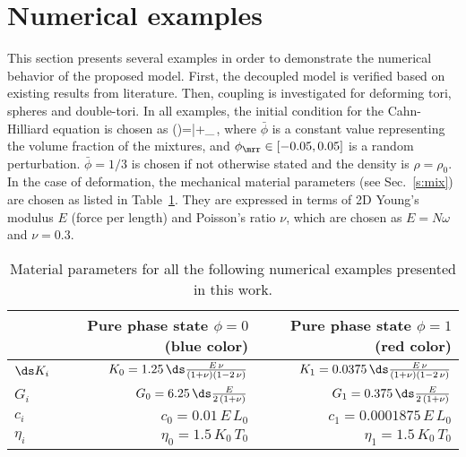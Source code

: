 \documentclass[11pt]{article}
\begin{document}
\section{Numerical examples}\label{s:num_ex}

This section presents several examples in order to demonstrate the numerical behavior of the proposed model.
First, the decoupled model is verified based on existing results from literature. 
Then, coupling is investigated for deforming tori, spheres and double-tori. 
%
In all examples, the initial condition for the Cahn-Hilliard equation is chosen as
\phi(\bx)=\bar{\phi}+\phi_\mrr\,, 
\label{eq:ic}
\eqe
where $\bar{\phi}$ is a constant value representing the volume fraction of the mixtures, and $\phi_\mrr \in [-0.05,0.05]$ is a random perturbation. 
$\bar{\phi}=1/3$ is chosen if not otherwise stated and the density is $\rho = \rho_0$. 
In the case of deformation, the mechanical material parameters (see Sec.~\ref{s:mix}) are chosen as listed in Table~\ref{tab:mat}.
They are expressed in terms of 2D Young's modulus $E$ (force per length) and Poisson's ratio $\nu$, which are chosen as
$E = N\omega$ and $\nu = 0.3$. 

\begin{table}[h]
\begin{center}
\begin{tabular}{| p{1.8cm} | r | r |}
    \hline
    $\,$ & Pure phase state $\phi=0$ (blue color)  & Pure phase state $\phi= 1$ (red color)\\ \hline
    $\ds K_i$ & $K_0 = 1.25\,\ds \frac{E\,\nu}{(1+\nu)(1-2\,\nu)}$ & $K_1 = 0.0375\,\ds \frac{E\,\nu}{(1+\nu)(1-2\,\nu)}$ \\ \hline
    $G_i$ & $G_0 = 6.25\,\ds \frac{E}{2\,(1+\nu)}$ & $G_1 = 0.375\,\ds \frac{E}{2\,(1+\nu)}$ \\ \hline
    $c_i$ & $c_0=0.01\,E\,L_0$ & $c_1 = 0.0001875\,E\,L_0$ \\ \hline
    $\eta_i$ & $\eta_0 = 1.5\,K_0\,T_0$ & $\eta_1 = 1.5\,K_0\,T_0$ \\
    \hline
\end{tabular}
\end{center}
\caption{Material parameters for all the following numerical examples presented in this work.}
\label{tab:mat}
\end{table}
\end{document}
